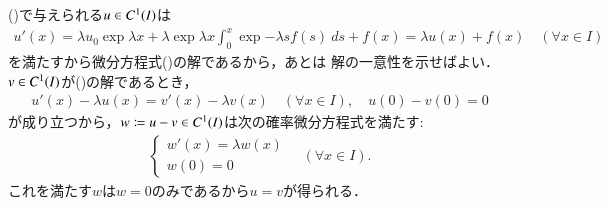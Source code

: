 	\begin{prf}
		()で与えられる$u \in \cn{I}{1}$は
		\begin{align}
			u'(x) = \lambda u_0 \exp{\lambda x} + \lambda \exp{\lambda x} \int_0^x \exp{-\lambda s} f(s)\ ds + f(x) 
			= \lambda u(x) + f(x)
			\quad (\forall x \in I)
		\end{align}
		を満たすから微分方程式()の解であるから，あとは
		解の一意性を示せばよい．$v \in \cn{I}{1}$が()の解であるとき，
		\begin{align}
			u'(x) - \lambda u(x) = v'(x) - \lambda v(x) \quad (\forall x \in I),
			\quad u(0) - v(0) = 0
		\end{align}
		が成り立つから，$w \coloneqq u - v \in \cn{I}{1}$は次の確率微分方程式を満たす:
		\begin{align}
			\begin{cases}
				w'(x) = \lambda w(x) \\
				w(0) = 0
			\end{cases}
			\quad (\forall x \in I).
		\end{align}
		これを満たす$w$は$w = 0$のみであるから$u = v$が得られる．
		\QED
	\end{prf}
	
